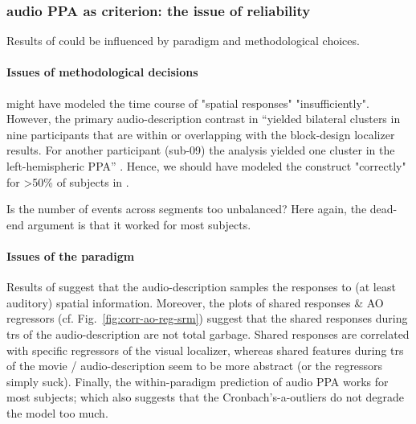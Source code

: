 


\subsubsection{audio PPA as criterion: the issue of reliability}





Results of \citet{haeusler2022processing} could be influenced by paradigm and
methodological choices.


\paragraph{Issues of methodological decisions}


%
\citet{haeusler2022processing} might have modeled the time course of "spatial
responses" "insufficiently".
%
However, the primary audio-description contrast in
\citet{haeusler2022processing} ``yielded bilateral clusters in nine participants
that are within or overlapping with the block-design localizer results.
%
For another participant (sub-09) the analysis yielded one cluster in the
left-hemispheric PPA'' \citep{haeusler2022processing}.
%
Hence, we should have modeled the construct "correctly" for >50\% of subjects in
\citet{haeusler2022processing}.


Is the number of events across segments too unbalanced?
%
Here again, the dead-end argument is that it worked for most subjects.


\paragraph{Issues of the paradigm}
%
Results of \citet{haeusler2022processing} suggest that the audio-description
samples the responses to (at least auditory) spatial information.
%
Moreover, the plots of shared responses \& AO regressors (cf.
Fig.~\ref{fig:corr-ao-reg-srm}) suggest that the shared responses during
\acp{tr} of the audio-description are not total garbage.
%
Shared responses are correlated with specific regressors of the visual
localizer, whereas shared features during \acp{tr} of the movie /
audio-description seem to be more abstract (or the regressors simply suck).
%
Finally, the within-paradigm prediction of audio PPA works for most subjects;
%
which also suggests that the Cronbach's-a-outliers do not degrade the model too
much.


